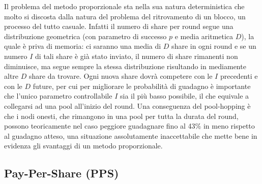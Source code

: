 Il problema del metodo proporzionale sta nella sua natura deterministica che molto si discosta dalla natura del problema del ritrovamento di un blocco, un processo del tutto casuale. Infatti il numero di share per round segue una distribuzione geometrica (con parametro di successo $p$ e media aritmetica $D$), la quale è priva di memoria: ci saranno una media di $D$ share in ogni round e se un numero $I$ di tali share è già stato inviato, il numero di share rimanenti non diminuisce, ma segue sempre la stessa distribuzione risultando in mediamente altre $D$ share da trovare. Ogni nuova share dovrà competere con le $I$ precedenti e con le $D$ future, per cui per migliorare le probabilità di guadagno è importante che l'unico parametro controllabile $I$ sia il più basso possibile, il che equivale a collegarsi ad una pool all'inizio del round.
Una conseguenza del pool-hopping è che i nodi onesti, che rimangono in una pool per tutta la durata del round, possono teoricamente nel caso peggiore guadagnare fino al 43\% in meno rispetto al guadagno atteso, una situazione assolutamente inaccettabile che mette bene in evidenza gli svantaggi di un metodo proporzionale.

\subsection{Pay-Per-Share (PPS)}

